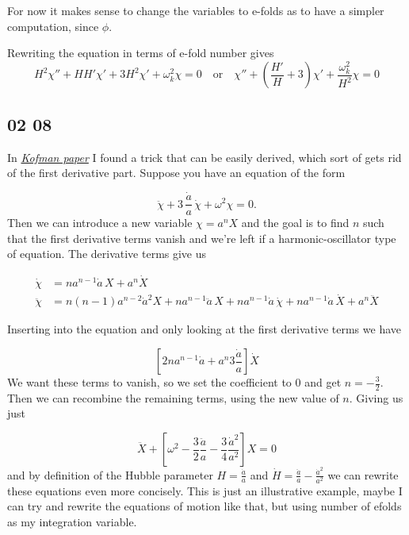 For now it makes sense to change the variables to e-folds as to have a simpler computation, since $\phi$.

Rewriting the equation in terms of e-fold number gives
\begin{equation*}
    H^2 \chi'' + H H' \chi' + 3 H^2  \chi' + \omega_k^2 \chi = 0 \quad \text{or} \quad \chi'' + \left( \frac{H'}{H} + 3 \right) \chi' + \frac{\omega_k^2}{H^2} \chi = 0
\end{equation*}


\subsection*{02 08}

In \href{https://arxiv.org/pdf/hep-ph/9704452}{\textit{Kofman paper}} I found a trick that can be easily derived, which sort of gets rid of the first derivative part. Suppose you have an equation of the form

\begin{equation*}
    \ddot{\chi} + 3\,\frac{\dot a}{a}\,\dot{\chi} + \omega^2 \chi = 0.
\end{equation*}
Then we can introduce a new variable $\chi = a^n X$ and the goal is to find $n$ such that the first derivative terms vanish and we're left if a harmonic-oscillator type of equation. The derivative terms give us

\begin{align*}
    \dot{\chi} &= n a^{n-1}\dot{a} \, X + a^{n}\dot{X} \\
    \ddot{\chi} &= n(n-1)a^{n-2}\dot{a}^{2} X + n a^{n-1}\ddot{a} \, X + n a^{n-1}\dot{a}\,\dot{\chi} + n a^{n-1}\dot{a}\,\dot{X} + a^{n}\ddot{X}
\end{align*}

Inserting into the equation and only looking at the first derivative terms we have

\begin{equation*}
    \left[ 2n a^{n-1} \dot{a} + a^n 3 \frac{\dot{a}}{a} \right] \dot{X}
\end{equation*}
We want these terms to vanish, so we set the coefficient to 0 and get $n=-\frac{3}{2}$. Then we can recombine the remaining terms, using the new value of $n$. Giving us just

\begin{equation}\label{eq: X harmonic equation}
\ddot{X} + \left[ \omega^2 - \frac{3}{2}\frac{\ddot a}{a} - \frac{3}{4}\frac{\dot a^2}{a^2} \right] X = 0
\end{equation}
and by definition of the Hubble parameter $H = \frac{\dot a}{a}$ and $\dot H = \frac{\ddot a}{a} - \frac{\dot a^2}{a^2}$ we can rewrite these equations even more concisely. This is just an illustrative example, maybe I can try and rewrite the equations of motion like that, but using number of efolds as my integration variable.

